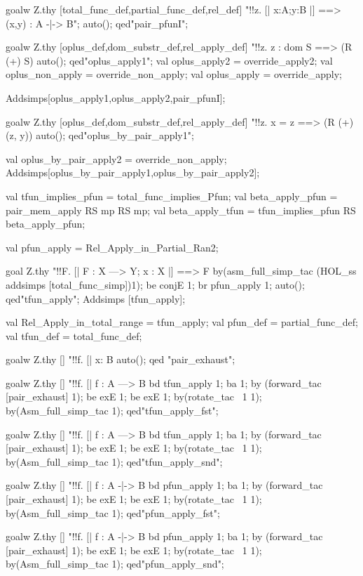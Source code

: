 \documentclass[a4paper,pdftex]{article}
\newenvironment{holz-proof}{\comment}{\endcomment}
\begin{document}
\begin{holz-proof}
goalw Z.thy [total_func_def,partial_func_def,rel_def]
"!!z. [| x:A;y:B |] ==> {(x,y)} : A -|-> B";
auto();
qed"pair_pfunI";


goalw Z.thy [oplus_def,dom_substr_def,rel_apply_def]
"!!z. z : dom S ==> (R (+) S) %
auto();
qed"oplus_apply1";
val oplus_apply2    = override_apply2;
val oplus_non_apply = override_non_apply;
val oplus_apply     = override_apply;

Addsimps[oplus_apply1,oplus_apply2,pair_pfunI];


goalw Z.thy [oplus_def,dom_substr_def,rel_apply_def]
"!!z. x = z ==> (R (+) {(z, y)}) %
auto();
qed"oplus_by_pair_apply1";

val oplus_by_pair_apply2 = override_non_apply;
Addsimps[oplus_by_pair_apply1,oplus_by_pair_apply2];


val tfun_implies_pfun = total_func_implies_Pfun;
val beta_apply_pfun   = pair_mem_apply RS mp RS mp;
val beta_apply_tfun   = tfun_implies_pfun RS beta_apply_pfun;

val pfun_apply = Rel_Apply_in_Partial_Ran2;

goal Z.thy "!!F. [| F : X ---> Y; x : X |] ==> F %
by(asm_full_simp_tac (HOL_ss addsimps [total_func_simp])1);
be conjE 1;
br pfun_apply 1;
auto();
qed"tfun_apply";
Addsimps [tfun_apply];

val Rel_Apply_in_total_range = tfun_apply;
val pfun_def = partial_func_def;
val tfun_def = total_func_def;


goalw Z.thy [] "!!f. [| x: B %
auto();
qed "pair_exhaust";


goalw Z.thy [] "!!f. [| f : A ---> B %
bd tfun_apply 1; ba 1;
by (forward_tac  [pair_exhaust] 1);
be exE 1; be exE 1;
by(rotate_tac ~1 1);
by(Asm_full_simp_tac 1);
qed"tfun_apply_fst";


goalw Z.thy [] "!!f. [| f : A ---> B %
bd tfun_apply 1; ba 1;
by (forward_tac  [pair_exhaust] 1);
be exE 1; be exE 1;
by(rotate_tac ~1 1);
by(Asm_full_simp_tac 1);
qed"tfun_apply_snd";


goalw Z.thy [] "!!f. [| f : A -|-> B %
bd pfun_apply 1; ba 1;
by (forward_tac  [pair_exhaust] 1);
be exE 1; be exE 1;
by(rotate_tac ~1 1);
by(Asm_full_simp_tac 1);
qed"pfun_apply_fst";


goalw Z.thy [] "!!f. [| f : A -|-> B %
bd pfun_apply 1; ba 1;
by (forward_tac  [pair_exhaust] 1);
be exE 1; be exE 1;
by(rotate_tac ~1 1);
by(Asm_full_simp_tac 1);
qed"pfun_apply_snd";




\end{holz-proof}
\end{document}
